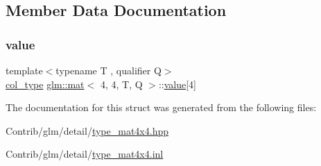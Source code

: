 \subsection{Member Data Documentation}
\mbox{\label{structglm_1_1mat_3_014_00_014_00_01_t_00_01_q_01_4_a43dd26acc0a0d26257b38393edc53328}} 
\subsubsection{\texorpdfstring{value}{value}}
{\footnotesize\ttfamily template$<$typename T , qualifier Q$>$ \\
\mbox{\hyperlink{structglm_1_1mat_3_014_00_014_00_01_t_00_01_q_01_4_aad430dc291d0156d573c434be7fdecc1}{col\+\_\+type}} \mbox{\hyperlink{structglm_1_1mat}{glm\+::mat}}$<$ 4, 4, T, Q $>$\+::\mbox{\hyperlink{_s_d_l__opengl__glext_8h_a8ad81492d410ff2ac11f754f4042150f}{value}}\mbox{[}4\mbox{]}\hspace{0.3cm}{\ttfamily [private]}}



The documentation for this struct was generated from the following files\+:\begin{DoxyCompactItemize}
\item 
Contrib/glm/detail/\mbox{\hyperlink{type__mat4x4_8hpp}{type\+\_\+mat4x4.\+hpp}}\item 
Contrib/glm/detail/\mbox{\hyperlink{type__mat4x4_8inl}{type\+\_\+mat4x4.\+inl}}\end{DoxyCompactItemize}
